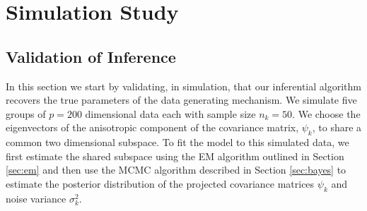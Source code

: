 \documentclass{article}
\newcommand{\etr}{\text{etr}}
\begin{document}





\section{Simulation Study}
\label{sec:simulation}

\subsection{Validation of Inference}

In this section we start by validating, in simulation, that our
inferential algorithm recovers the true parameters of the data
generating mechanism.  We simulate five groups of $p=200$ dimensional
data each with sample size $n_k=50$.  We choose the eigenvectors of
the anisotropic component of the covariance matrix, $\psi_k$, to share
a common two dimensional subspace.  To fit the model to this simulated
data, we first estimate the shared subspace using the EM algorithm outlined
in Section \ref{sec:em} and then use the MCMC algorithm described in
Section \ref{sec:bayes} to estimate the posterior distribution of the
projected covariance matrices $\psi_k$ and noise variance $\sigma_k^2$.
\end{document}
